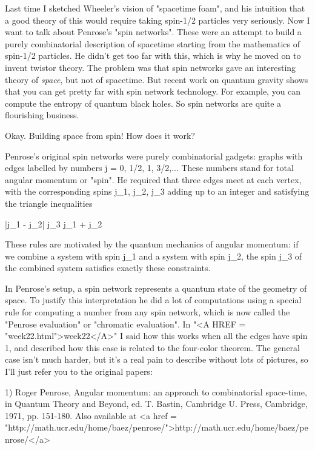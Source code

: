 

Last time I sketched Wheeler's vision of "spacetime foam", and his
intuition that a good theory of this would require taking spin-1/2
particles very seriously.  Now I want to talk about Penrose's "spin
networks".  These were an attempt to build a purely combinatorial
description of spacetime starting from the mathematics of spin-1/2
particles.  He didn't get too far with this, which is why he moved on to
invent twistor theory.  The problem was that spin networks gave an
interesting theory of \emph{space}, but not of spacetime.  But recent work on
quantum gravity shows that you can get pretty far with spin network
technology.  For example, you can compute the entropy of quantum black
holes.  So spin networks are quite a flourishing business.

Okay.  Building space from spin!  How does it work?

Penrose's original spin networks were purely combinatorial gadgets:
graphs with edges labelled by numbers j = 0, 1/2, 1, 3/2,...  These
numbers stand for total angular momentum or "spin".  He required that
three edges meet at each vertex, with the corresponding spins j_{1}, j_{2}, j_{3}
adding up to an integer and satisfying the triangle inequalities

                  |j_{1} - j_{2}| \le  j_{3} \le  j_{1} + j_{2}

These rules are motivated by the quantum mechanics of angular momentum:
if we combine a system with spin j_{1} and a system with spin j_{2}, the spin
j_{3} of the combined system satisfies exactly these constraints.  

In Penrose's setup, a spin network represents a quantum state of the
geometry of space.  To justify this interpretation he did a lot of
computations using a special rule for computing a number from any spin
network, which is now called the "Penrose evaluation" or "chromatic
evaluation".  In "<A HREF = "week22.html">week22</A>" I said how this works when all the edges have
spin 1, and described how this case is related to the four-color
theorem.  The general case isn't much harder, but it's a real pain to
describe without lots of pictures, so I'll just refer you to the
original papers:

1) Roger Penrose, Angular momentum: an approach to
combinatorial space-time, in Quantum Theory and Beyond,
ed. T. Bastin, Cambridge U. Press, Cambridge, 1971, pp. 151-180.
Also available at <a href = "http://math.ucr.edu/home/baez/penrose/">http://math.ucr.edu/home/baez/penrose/</a>

